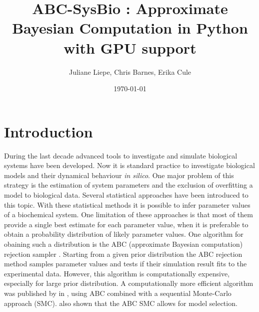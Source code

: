 \documentclass[a4paper]{report}
\title{ABC-SysBio : Approximate Bayesian Computation in Python with GPU support}
\author{Juliane Liepe, Chris Barnes,  Erika Cule}
\date{\today}
\begin{document}
\maketitle

\tableofcontents

\chapter{Introduction}


During the last decade advanced tools to investigate and simulate biological systems have been developed. Now it is standard practice to investigate biological models and their dynamical behaviour {\it in silico}. One major problem of this strategy is the estimation of system parameters and the exclusion of overfitting a model to biological data. Several statistical approaches have been introduced to this topic. With these statistical methods it is possible to infer parameter values of a biochemical system. One limitation of these approaches is that most of them provide a single best estimate for each parameter value, when it is preferable to obtain a probability distribution of likely parameter values. One algorithm for obaining such a distribution is the ABC (approximate Bayesian computation) rejection sampler \citep{ABCrejection}. Starting from a given prior distribution the ABC rejection method samples parameter values and tests if their simulation result fits to the experimental data. However, this algorithm is computationally expensive, especially for large prior distribution. A computationally more efficient algorithm was published by \citeauthor{Toni2009} in  \citeyear{Toni2009}, using ABC combined with a sequential Monte-Carlo approach (SMC). \citep{Toni2009,Toni2010} also shown that the ABC SMC allows for model selection.
\end{document}
